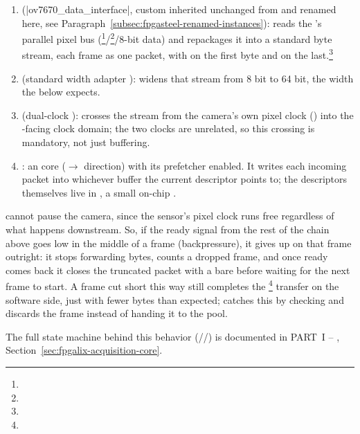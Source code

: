 \begin{enumerate}
    \item \textbf{} (|ov7670_data_interface|, custom  inherited unchanged from  and renamed here, see Paragraph~\ref{subsec:fpgasteel-renamed-instances}): reads the 's parallel pixel bus (\footnote{}/\footnote{}/8-bit data) and repackages it into a standard  byte stream, each frame as one packet, with  on the first byte and  on the last.\footnote{}
    \item \textbf{} (standard  width adapter ): widens that stream from 8 bit to 64 bit, the width the  below expects.
    \item \textbf{} (dual-clock ): crosses the stream from the camera's own pixel clock () into the -facing clock domain; the two clocks are unrelated, so this crossing is mandatory, not just buffering.
    \item \textbf{}: an  core ($\rightarrow$ direction) with its prefetcher enabled. It writes each incoming packet into whichever  buffer the current descriptor points to; the descriptors themselves live in , a small on-chip .
\end{enumerate}

 cannot pause the camera, since the sensor's pixel clock runs free regardless of what happens downstream. So, if the  ready signal from the rest of the chain above goes low in the middle of a frame (backpressure), it gives up on that frame outright: it stops forwarding bytes, counts a dropped frame, and once ready comes back it closes the truncated packet with a bare  before waiting for the next frame to start. A frame cut short this way still completes the \footnote{} transfer on the software side, just with fewer bytes than expected;  catches this by checking  and discards the frame instead of handing it to the pool.

The full state machine behind this behavior (//) is documented in PART~I -- , Section~\ref{sec:fpgalix-acquisition-core}.

